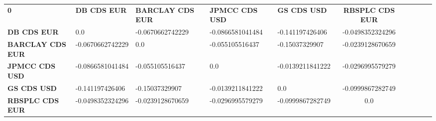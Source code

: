 \begin{tabular}{|l|l|l|l|l|c|c|c|c|c|}
\hline
\textbf{0} & \textbf{DB CDS EUR} & \textbf{BARCLAY CDS EUR} & \textbf{JPMCC CDS USD} & \textbf{GS CDS USD} & \textbf{RBSPLC CDS EUR}\\\hhline{|=|=|=|=|=|=|}
\textbf{DB CDS EUR} & 0.0 & -0.0670662742229 & -0.0866581041484 & -0.141197426406 & -0.0498352324296\\
\textbf{BARCLAY CDS EUR} & -0.0670662742229 & 0.0 & -0.055105516437 & -0.15037329907 & -0.0239128670659\\
\textbf{JPMCC CDS USD} & -0.0866581041484 & -0.055105516437 & 0.0 & -0.0139211841222 & -0.0296995579279\\
\textbf{GS CDS USD} & -0.141197426406 & -0.15037329907 & -0.0139211841222 & 0.0 & -0.0999867282749\\
\textbf{RBSPLC CDS EUR} & -0.0498352324296 & -0.0239128670659 & -0.0296995579279 & -0.0999867282749 & 0.0\\
\hline
\end{tabular}
